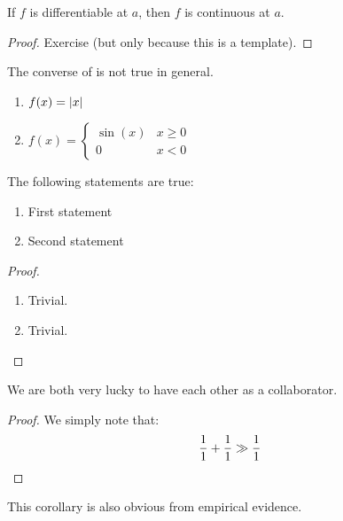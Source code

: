 \documentclass[10pt]{extarticle}
\begin{document}
\begin{proposition}\label{diffcont}
If $f$ is differentiable at $a$, then $f$ is continuous at $a$.
\end{proposition}
\begin{proof}
Exercise (but only because this is a template).
\end{proof}

The converse of  is not true in general.

\begin{examples}\leavevmode %
\begin{enumerate}
    \item $f(x)=\abs{x}$
    \item $f(x)=\begin{cases} \sin(x) & x\ge 0 \\ 0 & x<0 \end{cases}$
\end{enumerate}
\end{examples}

\begin{theorem}
The following statements are true:
\begin{enumerate}
    \item First statement
    \item Second statement
\end{enumerate}
\end{theorem}
\begin{proof}%
\begin{enumerate}
    \item Trivial.
    \item Trivial.\qedhere %
\end{enumerate}
\end{proof}

\begin{corollary}
We are both very lucky to have each other as a collaborator.
\end{corollary}
\begin{proof}
We simply note that:
\begin{equation*}
    \frac{1}{1}+\frac{1}{1}\gg\frac{1}{1} \qedhere
\end{equation*}
\end{proof}
\begin{remark}
This corollary is also obvious from empirical evidence.
\end{remark}
\end{document}
